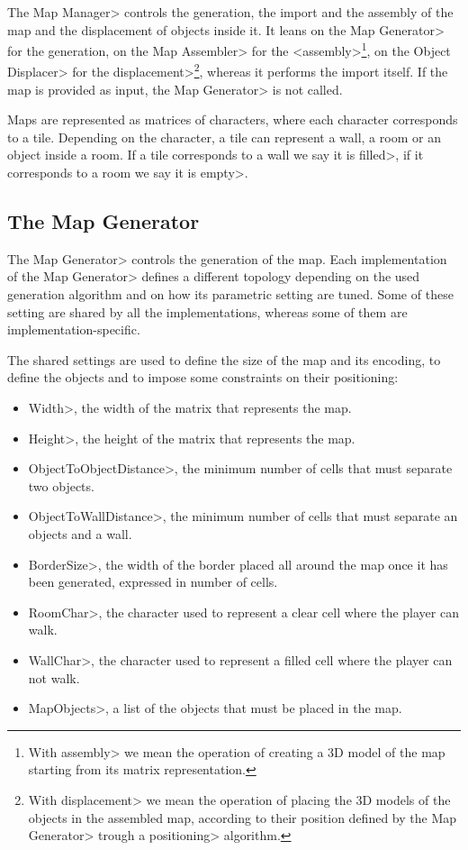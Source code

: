 The \<Map Manager> controls the generation, the import and the assembly of the map and the displacement of objects inside it. It leans on the \<Map Generator> for the generation, on the \<Map Assembler> for the <assembly>\footnote{With \<assembly> we mean the operation of creating a 3D model of the map starting from its matrix representation.}, on the \<Object Displacer> for the \<displacement>\footnote{With \<displacement> we mean the operation of placing the 3D models of the objects in the assembled map, according to their position defined by the \<Map Generator> trough a \<positioning> algorithm.}, whereas it performs the import itself. If the map is provided as input, the \<Map Generator> is not called.

\par

Maps are represented as matrices of characters, where each character corresponds to a tile. Depending on the character, a tile can represent a wall, a room or an object inside a room. If a tile corresponds to a wall we say it is \<filled>, if it corresponds to a room we say it is \<empty>.
 
\subsection{The Map Generator}

The \<Map Generator> controls the generation of the map. Each implementation of the \<Map Generator> defines a different topology depending on the used generation algorithm and on how its parametric setting are tuned. Some of these setting are shared by all the implementations, whereas some of them are implementation-specific.

\par

The shared settings are used to define the size of the map and its encoding, to define the objects and to impose some constraints on their positioning:

\begin{itemize}
\item \<Width>, the width of the matrix that represents the map.
\item \<Height>, the height of the matrix that represents the map.
\item \<ObjectToObjectDistance>, the minimum number of cells that must separate two objects. 
\item \<ObjectToWallDistance>, the minimum number of cells  that must separate an objects and a wall.
\item \<BorderSize>, the width of the border placed all around the map once it has been generated, expressed in number of cells.
\item \<RoomChar>, the character used to represent a clear cell where the player can walk.
\item \<WallChar>,  the character used to represent a filled cell where the player can not walk.
\item \<MapObjects>, a list of the objects that must be placed in the map.
\end{itemize}

